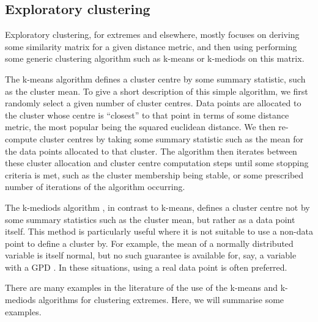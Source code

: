 \documentclass{article}
\numberwithin{equation}{section}
\begin{document}
\subsection{Exploratory clustering}

Exploratory clustering, for extremes and elsewhere, mostly focuses on deriving some similarity matrix for a given distance metric, and then using performing some generic clustering algorithm such as k-means or k-mediods on this matrix.

The k-means algorithm \cite{Macqueen1967} defines a cluster centre by some summary statistic, such as the cluster mean.
To give a short description of this simple algorithm, we first randomly select a given number of cluster centres.
Data points are allocated to the cluster whose centre is ``closest'' to that point in terms of some distance metric, the most popular being the squared euclidean distance.
We then re-compute cluster centres by taking some summary statistic such as the mean for the data points allocated to that cluster.
The algorithm then iterates between these cluster allocation and cluster centre computation steps until some stopping criteria is met, such as the cluster membership being stable, or some prescribed number of iterations of the algorithm occurring.

The k-mediods algorithm \cite{Kaufman1987}, in contrast to k-means, defines a cluster centre not by some summary statistics such as the cluster mean, but rather as a data point itself.
This method is particularly useful where it is not suitable to use a non-data point to define a cluster by. 
For example, the mean of a normally distributed variable is itself normal, but no such guarantee is available for, say, a variable with a GPD \cite{Vignotto2021}.
In these situations, using a real data point is often preferred.

There are many examples in the literature of the use of the k-means and k-mediods algorithms for clustering extremes.
Here, we will summarise some examples.

\end{document}
